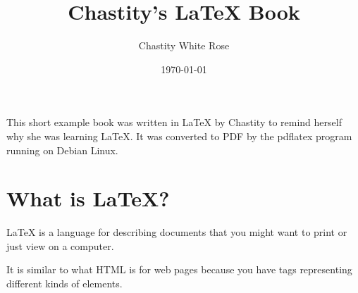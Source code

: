\documentclass{book}
\title{Chastity's LaTeX Book}
\date{\today}
\author{Chastity White Rose}
\begin{document}
\maketitle


This short example book was written in LaTeX by Chastity to remind herself why she was learning LaTeX. It was converted to PDF by the pdflatex program running on Debian Linux.

\chapter{What is LaTeX?}

LaTeX is a language for describing documents that you might want to print or just view on a computer.

It is similar to what HTML is for web pages because you have tags representing different kinds of elements.
\end{document}
